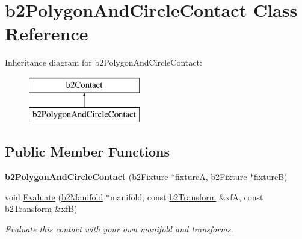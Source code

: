 \hypertarget{classb2_polygon_and_circle_contact}{}\section{b2\+Polygon\+And\+Circle\+Contact Class Reference}
\label{classb2_polygon_and_circle_contact}
Inheritance diagram for b2\+Polygon\+And\+Circle\+Contact\+:\begin{figure}[H]
\begin{center}
\leavevmode
\includegraphics[height=2.000000cm]{classb2_polygon_and_circle_contact}
\end{center}
\end{figure}
\subsection*{Public Member Functions}
\begin{DoxyCompactItemize}
\item 
{\bfseries b2\+Polygon\+And\+Circle\+Contact} (\hyperlink{classb2_fixture}{b2\+Fixture} $\ast$fixtureA, \hyperlink{classb2_fixture}{b2\+Fixture} $\ast$fixtureB)\hypertarget{classb2_polygon_and_circle_contact_a38158da229eee22253c1f64df1982e40}{}\label{classb2_polygon_and_circle_contact_a38158da229eee22253c1f64df1982e40}

\item 
void \hyperlink{classb2_polygon_and_circle_contact_ac24d495022aae853cb573f86c8d86c3d}{Evaluate} (\hyperlink{structb2_manifold}{b2\+Manifold} $\ast$manifold, const \hyperlink{structb2_transform}{b2\+Transform} \&xfA, const \hyperlink{structb2_transform}{b2\+Transform} \&xfB)\hypertarget{classb2_polygon_and_circle_contact_ac24d495022aae853cb573f86c8d86c3d}{}\label{classb2_polygon_and_circle_contact_ac24d495022aae853cb573f86c8d86c3d}

\begin{DoxyCompactList}\small\item\em Evaluate this contact with your own manifold and transforms. \end{DoxyCompactList}\end{DoxyCompactItemize}
